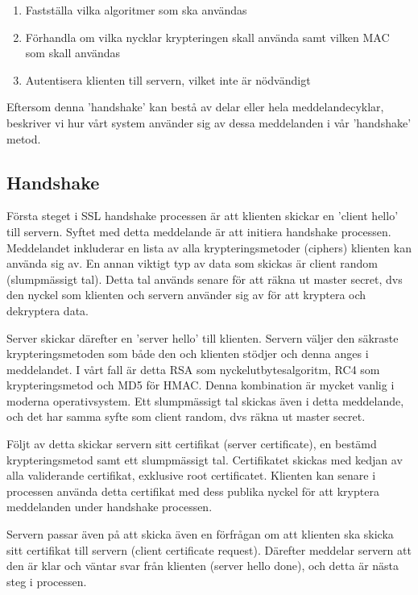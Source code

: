 \begin{enumerate}
\item{Fastställa vilka algoritmer som ska användas}
\item{Förhandla om vilka nycklar krypteringen skall använda samt vilken MAC som skall användas}
\item{Autentisera klienten till servern, vilket inte är nödvändigt}
\end{enumerate}

Eftersom denna 'handshake' kan bestå av delar eller hela meddelandecyklar, beskriver vi hur vårt system använder sig av dessa meddelanden i vår 'handshake' metod.

\subsection{Handshake}
Första steget i SSL handshake processen är att klienten skickar en 'client hello' till servern. Syftet med detta meddelande är att initiera handshake processen. Meddelandet inkluderar en lista av alla krypteringsmetoder (ciphers) klienten kan använda sig av. En annan viktigt typ av data som skickas är client random (slumpmässigt tal). Detta tal används senare för att räkna ut master secret, dvs den nyckel som klienten och servern använder sig av för att kryptera och dekryptera data.

Server skickar därefter en 'server hello' till klienten. Servern väljer den säkraste krypteringsmetoden som både den och klienten stödjer och denna anges i meddelandet. I vårt fall är detta RSA som nyckelutbytesalgoritm, RC4 som krypteringsmetod och MD5 för HMAC. Denna kombination är mycket vanlig i moderna operativsystem. Ett slumpmässigt tal skickas även i detta meddelande, och det har samma syfte som client random, dvs räkna ut master secret.

Följt av detta skickar servern sitt certifikat (server certificate), en bestämd krypteringsmetod samt ett slumpmässigt tal. Certifikatet skickas med kedjan av alla validerande certifikat, exklusive root certificatet. Klienten kan senare i processen använda detta certifikat med dess publika nyckel för att kryptera meddelanden under handshake processen.

Servern passar även på att skicka även en förfrågan om att klienten ska skicka sitt certifikat till servern (client certificate request). Därefter meddelar servern att den är klar och väntar svar från klienten (server hello done), och detta är nästa steg i processen.

